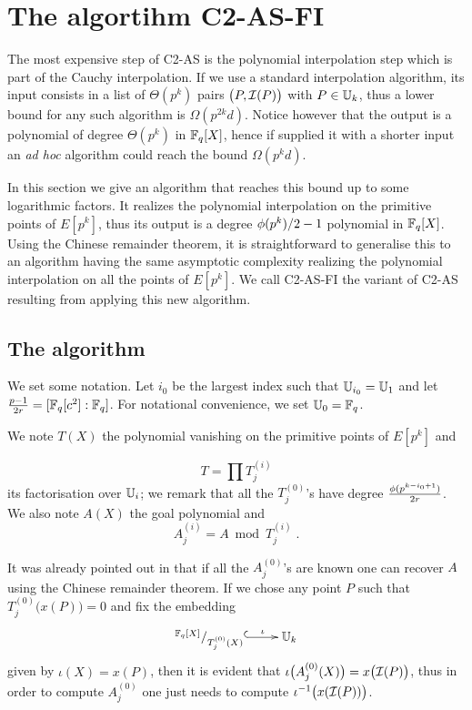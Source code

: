 \section{The algortihm C2-AS-FI}
\label{sec:C2-AS-FI}

The most expensive step of C2-AS is the polynomial interpolation step
which is part of the Cauchy interpolation. If we use a standard
interpolation algorithm, its input consists in a list of $\Theta(p^k)$
pairs $\bigl(P, \mathcal{I}(P)\bigr)$ with $P\in\mathbb{U}_k$, thus a lower bound for
any such algorithm is $\Omega(p^{2k}d)$. Notice however that the
output is a polynomial of degree $\Theta(p^k)$ in $\mathbb{F}_q[X]$, hence if
supplied it with a shorter input an \emph{ad hoc} algorithm could
reach the bound $\Omega(p^kd)$.

In this section we give an algorithm that reaches this bound up to
some logarithmic factors. It realizes the polynomial interpolation on
the primitive points of $E[p^k]$, thus its output is a degree
$\phi(p^k)/2-1$ polynomial in $\mathbb{F}_q[X]$. Using the Chinese remainder
theorem, it is straightforward to generalise this to an algorithm
having the same asymptotic complexity realizing the polynomial
interpolation on all the points of $E[p^k]$. We call C2-AS-FI the
variant of C2-AS resulting from applying this new algorithm.

\subsection{The algorithm}
We set some notation. Let $i_0$ be the largest index such that
$\mathbb{U}_{i_0} = \mathbb{U}_1$ and let $\frac{p-1}{2r} = [\mathbb{F}_q[c^2]:\mathbb{F}_q]$. For
notational convenience, we set $\mathbb{U}_0=\mathbb{F}_q$.

We note $T(X)$ the polynomial vanishing on the primitive points of
$E[p^k]$ and

\begin{equation}
  \label{eq:T}
  T = \prod T_j^{(i)}
\end{equation}
its factorisation over $\mathbb{U}_i$; we remark that all the $T_j^{(0)}$'s
have degree $\frac{\phi(p^{k-i_0+1})}{2r}$. We also note $A(X)$ the goal
polynomial and
\begin{equation}
  \label{eq:A}
  A_j^{(i)} = A \bmod T_j^{(i)}
  \;\text{.}
\end{equation}

It was already pointed out in \cite[$\S$2.3]{Cou96} that if all the
$A_j^{(0)}$'s are known one can recover $A$ using the Chinese remainder
theorem. If we chose any point $P$ such that
$T_j^{(0)}\bigl(x(P)\bigr)=0$ and fix the embedding
\begin{equation}
  \label{eq:embed}
  \xymatrix{
    ^{\F_q[X]}/_{T_j^{(0)}(X)} \ar@{^{(}->}[r]^-\iota & \U_k
  }
\end{equation}
given by $\iota(X) = x(P)$, then it is evident that
$\iota\bigl(A_j^{(0)}(X)\bigr) = x\bigl(\mathcal{I}(P)\bigr)$, thus in order to
compute $A_j^{(0)}$ one just needs to compute
$\iota^{-1}\bigl(x(\mathcal{I}(P))\bigr)$.

